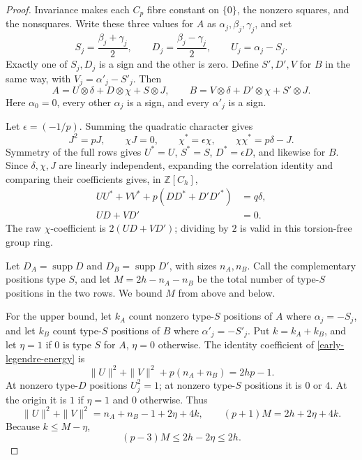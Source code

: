 \documentclass[11pt]{article}
\theoremstyle{definition}
\theoremstyle{remark}
\begin{document}
\begin{proof}
Invariance makes each $C_p$ fibre constant on $\{0\}$, the nonzero
squares, and the nonsquares. Write these three values for $A$ as
$\alpha_j,\beta_j,\gamma_j$, and set
\[
 S_j=\frac{\beta_j+\gamma_j}{2},\qquad
 D_j=\frac{\beta_j-\gamma_j}{2},\qquad U_j=\alpha_j-S_j.
\]
Exactly one of $S_j,D_j$ is a sign and the other is zero. Define
$S',D',V$ for $B$ in the same way, with $V_j=\alpha'_j-S'_j$. Then
\begin{equation}
 A=U\otimes\delta+D\otimes\chi+S\otimes J,\qquad
 B=V\otimes\delta+D'\otimes\chi+S'\otimes J.
 \label{early-legendre-decomp}
\end{equation}
Here $\alpha_0=0$, every other $\alpha_j$ is a sign, and every
$\alpha'_j$ is a sign.

Let $\epsilon=(-1/p)$. Summing the quadratic character gives
\[
 J^2=pJ,\qquad \chi J=0,\qquad
 \chi^*=\epsilon\chi,\qquad \chi\chi^*=p\delta-J.
\]
Symmetry of the full rows gives $U^*=U$, $S^*=S$, $D^*=\epsilon D$, and
likewise for $B$. Since $\delta,\chi,J$ are linearly independent,
expanding the correlation identity and comparing their coefficients gives,
in $\mathbb Z[C_h]$,
\begin{align}
 UU^*+VV^*+p(DD^*+D'D'^*)&=q\delta,\label{early-legendre-energy}\\
 UD+VD'&=0.\label{early-legendre-cross}
\end{align}
The raw $\chi$-coefficient is $2(UD+VD')$; dividing by $2$ is valid in
this torsion-free group ring.

Let $D_A=\operatorname{supp}D$ and $D_B=\operatorname{supp}D'$, with
sizes $n_A,n_B$. Call the complementary positions type $S$, and let
$M=2h-n_A-n_B$ be the total number of type-$S$ positions in the two rows.
We bound $M$ from above and below.

For the upper bound, let $k_A$ count nonzero type-$S$ positions of $A$
where $\alpha_j=-S_j$, and let $k_B$ count type-$S$ positions of $B$
where $\alpha'_j=-S'_j$. Put $k=k_A+k_B$, and let $\eta=1$ if $0$ is type
$S$ for $A$, $\eta=0$ otherwise. The identity coefficient of
\eqref{early-legendre-energy} is
\[
 \|U\|^2+\|V\|^2+p(n_A+n_B)=2hp-1.
\]
At nonzero type-$D$ positions $U_j^2=1$; at nonzero type-$S$ positions it
is $0$ or $4$. At the origin it is $1$ if $\eta=1$ and $0$ otherwise.
Thus
\[
 \|U\|^2+\|V\|^2=n_A+n_B-1+2\eta+4k,
 \qquad (p+1)M=2h+2\eta+4k.
\]
Because $k\leq M-\eta$,
\begin{equation}
 (p-3)M\leq2h-2\eta\leq2h.
 \label{early-upper-M}
\end{equation}


\end{proof}
\end{document}
